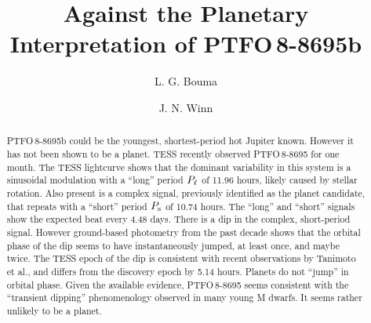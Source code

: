 \documentclass[12pt,twocolumn,tighten]{aastex62}
\begin{document}

\title{Against the Planetary Interpretation of PTFO$\,$8-8695b}


%
%
\author[0000-0002-0514-5538]{L. G. Bouma}
%
\author[0000-0002-4265-047X]{J. N. Winn}

%
%

\begin{abstract}
  PTFO$\,$8-8695b could be the youngest, shortest-period 
  hot Jupiter known.  However it has not been shown to be a planet.
  TESS recently observed PTFO$\,$8-8695 for one month.
  The TESS lightcurve shows that the dominant variability in this
  system is a sinusoidal modulation with a ``long'' period $P_{\rm
  \ell}$
  of 11.96 hours, likely caused by stellar rotation.
  Also present is a complex signal, previously identified as the
  planet candidate, that repeats with a ``short'' period $P_{\rm s}$ of
  10.74 hours.
  The ``long'' and ``short'' signals show the expected beat every 4.48
  days.
  There is a dip in the complex, short-period signal.
  However ground-based photometry from the past decade shows that the
  orbital phase of the dip seems to have instantaneously jumped, at
  least once, and maybe twice.
  The TESS epoch of the dip is consistent with recent observations by
  Tanimoto et al., and differs from the discovery epoch by 5.14 hours.
  Planets do not ``jump'' in orbital phase.
  Given the available evidence,
  PTFO$\,$8-8695 seems consistent with the
  ``transient dipping'' phenomenology observed in many young M dwarfs.
  It seems rather unlikely to be a planet.
\end{abstract}
\end{document}
